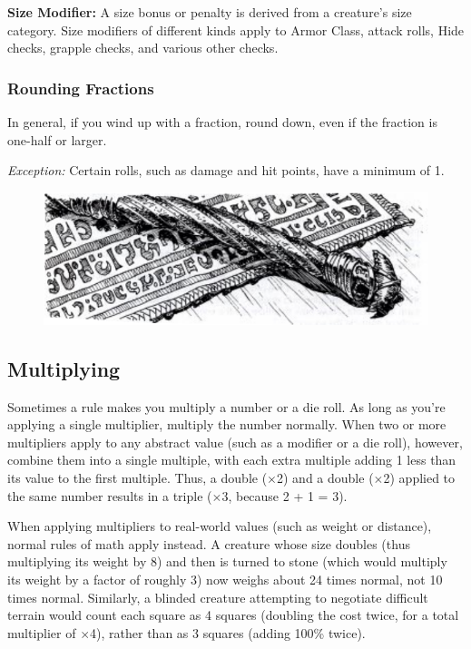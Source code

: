 \textbf{Size Modifier:} A size bonus or penalty is derived from a creature's size category. Size modifiers of different kinds apply to Armor Class, attack rolls, Hide checks, grapple checks, and various other checks.

\subsubsection{Rounding Fractions}
In general, if you wind up with a fraction, round down, even if the fraction is one-half or larger.

\textit{Exception:} Certain rolls, such as damage and hit points, have a minimum of 1.

\begin{figure}[b!]
\centering
\includegraphics[width=\textwidth]{images/filler-1.png}
\WOTC
\end{figure}

\subsection{Multiplying}
Sometimes a rule makes you multiply a number or a die roll. As long as you're applying a single multiplier, multiply the number normally. When two or more multipliers apply to any abstract value (such as a modifier or a die roll), however, combine them into a single multiple, with each extra multiple adding 1 less than its value to the first multiple. Thus, a double ($\times$2) and a double ($\times$2) applied to the same number results in a triple ($\times$3, because 2 + 1 = 3).

\vskip1cm

When applying multipliers to real-world values (such as weight or distance), normal rules of math apply instead. A creature whose size doubles (thus multiplying its weight by 8) and then is turned to stone (which would multiply its weight by a factor of roughly 3) now weighs about 24 times normal, not 10 times normal. Similarly, a blinded creature attempting to negotiate difficult terrain would count each square as 4 squares (doubling the cost twice, for a total multiplier of $\times$4), rather than as 3 squares (adding 100\% twice).

